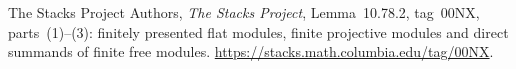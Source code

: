  The Stacks Project Authors,
\emph{The Stacks Project}, Lemma~10.78.2, tag~00NX,
parts~(1)--(3): finitely presented flat modules,
finite projective modules and direct summands of
finite free modules.
\url{https://stacks.math.columbia.edu/tag/00NX}.
